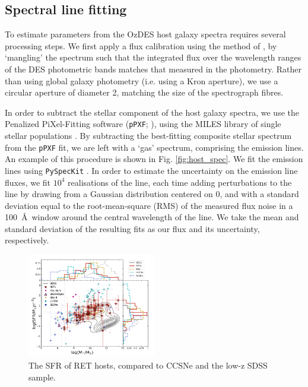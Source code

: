 \documentclass[fleqn,usenatbib,]{mnras}
\begin{document}
\subsection{Spectral line fitting \label{subsec:linefit}}

To estimate parameters from the OzDES host galaxy spectra requires several processing steps. We first apply a flux calibration using the method of \citet{Swann2020}, by `mangling' the spectrum such that the integrated flux over the wavelength ranges of the DES photometric bands matches that measured in the photometry. Rather than using global galaxy photometry (i.e. using a Kron aperture), we use a circular aperture of diameter 2\arcsec, matching the size of the spectrograph fibres.  

In order to subtract the stellar component of the host galaxy spectra, we use the Penalized PiXel-Fitting software (\texttt{pPXF}; \citealt{Cappellari2004,Cappellari2012,Cappellari2017}), using the MILES library of single stellar populations \citep{Vazdekis2010}. By subtracting the best-fitting composite stellar spectrum from the \texttt{pPXF} fit, we are left with a `gas' spectrum, comprising the emission lines. An example of this procedure is shown in Fig. \ref{fig:host_spec}. We fit the emission lines using \texttt{PySpecKit} \citep{Ginsburg2011}. In order to estimate the uncertainty on the emission line fluxes, we fit $10^4$ realisations of the line, each time adding perturbations to the line by drawing from a Gaussian distribution centered on 0, and with a standard deviation equal to the root-mean-square (RMS) of the measured flux noise in a 100~\AA~window around the central wavelength of the line. We take the mean and standard deviation of the resulting fits as our flux and its uncertainty, respectively.

\begin{figure}
\includegraphics[width=0.5\textwidth]{figs/SFR_Mike.png}
\caption{The SFR of RET hosts, compared to CCSNe and the low-z SDSS sample.
\label{fig:sfms_sfr}}
\end{figure}
\end{document}
